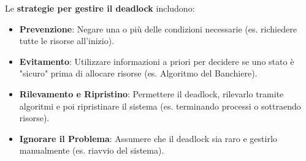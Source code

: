 Le \textbf{strategie per gestire il deadlock} includono:
\begin{itemize}
    \item \textbf{Prevenzione}: Negare una o più delle condizioni necessarie (es. richiedere tutte le risorse all'inizio).
    \item \textbf{Evitamento}: Utilizzare informazioni a priori per decidere se uno stato è "sicuro" prima di allocare risorse (es. Algoritmo del Banchiere).
    \item \textbf{Rilevamento e Ripristino}: Permettere il deadlock, rilevarlo tramite algoritmi e poi ripristinare il sistema (es. terminando processi o sottraendo risorse).
    \item \textbf{Ignorare il Problema}: Assumere che il deadlock sia raro e gestirlo manualmente (es. riavvio del sistema).
\end{itemize}
